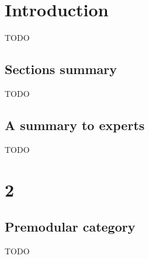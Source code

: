 \section{Introduction}

TODO

\subsection{Sections summary}

TODO

\subsection{A summary to experts}\label{subsection/a-summary-to-experts}

TODO

\section{2}\label{section/algebra}
\subsection{Premodular category}

TODO
